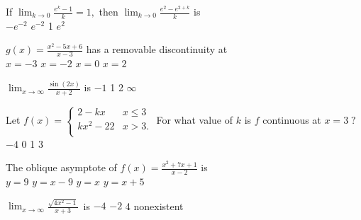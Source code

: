 \begin{question}
If \(\lim_{k \to 0} \frac{e^k - 1}{k} = 1,\) then \(\lim_{k \to 0} \frac{e^2 - e^{2 + k}}{k}\) is \\
\choicesline
{}
{\(-e^{-2}\)}
{\(e^{-2}\)}
{1}
{\(e^2\)}
\end{question}

\begin{question}
\(g(x) = \frac{x^2 - 5x + 6}{x - 3}\) \; has a removable discontinuity at \\ 
\choicesline
{\(x = -3\)}
{\(x = -2\)}
{\(x = 0\)}
{\(x = 2\)}
{}
\end{question}

\begin{question}
\(\lim_{x \to \infty} \frac{\sin(2x)}{x + 2}\) is 
\choicesline
{\(-1\)}
{}
{1}
{2}
{\(\infty\)}
\end{question}

\begin{question}
Let
\( f(x) = \begin{cases} 
2 - kx & x\leqslant 3 \\
kx^2 -22 & x > 3. \\ 
\end{cases}
\)
For what value of \(k\) is \(f\) continuous at \(x = 3 \; ?\) \\
\choicesline
{\(-4\)}
{0}
{1}
{}
{3}
\end{question}

\begin{question}
The oblique asymptote of \(f(x) = \frac{x^2 + 7x + 1}{x - 2}\) is \\ 
\choicesline
{\(y = 9\)}
{\(y = x - 9\)}
{\(y = x\)}
{\(y = x + 5\)}
{}
\end{question}

\begin{question}
\(\lim_{x \to \infty} \frac{\sqrt{4x^2 - 1}}{x + 3} \, \) is 
\choicesline
{\(-4\)}
{\(-2\)}
{}
{4}
{nonexistent}
\end{question}

